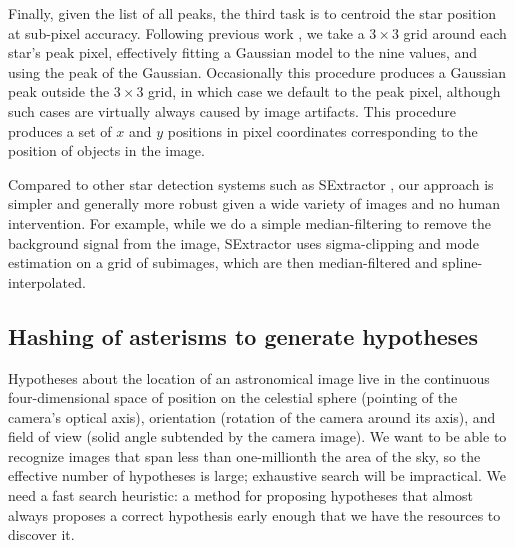 
Finally, given the list of all peaks, the third task is to centroid
the star position at sub-pixel accuracy. Following previous work
\cite{sdssimaging}, we take a $3\times 3$ grid around each star's peak
pixel, effectively fitting a Gaussian model to the nine values, and
using the peak of the Gaussian. Occasionally this procedure produces a
Gaussian peak outside the $3\times 3$ grid, in which case we default
to the peak pixel, although such cases are virtually always caused by
image artifacts.  This procedure produces a set of $x$ and $y$
positions in pixel coordinates corresponding to the position of
objects in the image.


Compared to other star detection systems such as
SExtractor \cite{sextractor}, our approach is simpler and generally
more robust given a wide variety of images and no human intervention.
For example, while we do a simple median-filtering to remove the
background signal from the image, SExtractor uses sigma-clipping and
mode estimation on a grid of subimages, which are then median-filtered
and spline-interpolated.

\subsection{Hashing of asterisms to generate hypotheses}

Hypotheses about the location of an astronomical image live in the
continuous four-dimensional space of position on the celestial sphere
(pointing of the camera's optical axis), orientation (rotation of the
camera around its axis), and field of view (solid angle subtended by
the camera image).  We want to be able to recognize images that span
less than one-millionth the area of the sky, so the effective number
of hypotheses is large; exhaustive search will be impractical.  We
need a fast search heuristic: a method for proposing hypotheses that
almost always proposes a correct hypothesis early enough that we have
the resources to discover it.

